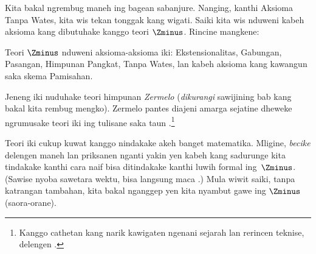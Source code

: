 \documentclass[../../../include/open-logic-section]{subfiles}
\begin{document}

Kita bakal ngrembug maneh \stagesinf{} ing bagean sabanjure.
Nanging, kanthi Aksioma Tanpa Wates, kita wis tekan
tonggak kang wigati. Saiki kita wis nduweni kabeh aksioma
kang dibutuhake kanggo teori $\Zminus$. Rincine mangkene:

\begin{defn}
Teori $\Zminus$ nduweni aksioma-aksioma iki:
Ekstensionalitas, Gabungan, Pasangan, Himpunan Pangkat,
Tanpa Wates, lan kabeh aksioma kang kawangun saka skema Pamisahan.
\end{defn}

Jeneng iki nuduhake teori himpunan \emph{Zermelo}
(\emph{dikurangi} sawijining bab kang bakal kita rembug
mengko). Zermelo pantes diajeni amarga sejatine dheweke
ngrumusake teori iki ing tulisane saka taun
\citeyear{Zermelo1908Untersuchungen}.\footnote{Kanggo
cathetan kang narik kawigaten ngenani sejarah lan
rerincen teknise, delengen \citet[Appendix
A]{Potter2004}.}

Teori iki cukup kuwat kanggo nindakake akeh banget
matematika. Mligine, \emph{becike} delengen maneh
 lan priksanen nganti yakin yen kabeh
kang sadurunge kita tindakake kanthi cara naif bisa
ditindakake kanthi luwih formal ing~$\Zminus$. (Sawise
nyoba sawetara wektu, bisa langsung maca
.) Mula wiwit saiki,
tanpa katrangan tambahan, kita bakal nganggep yen
kita nyambut gawe ing $\Zminus$ (saora-orane).
\end{document}
